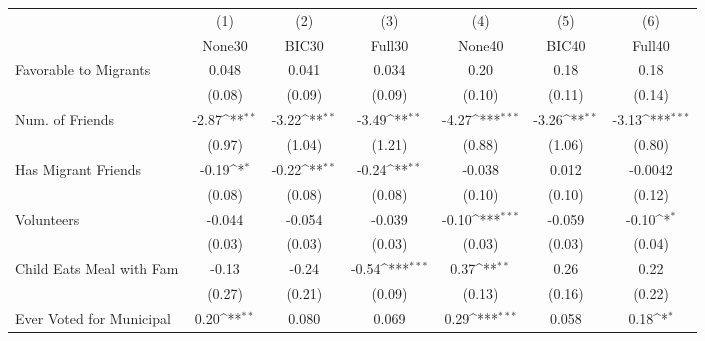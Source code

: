 {
\def\sym#1{\ifmmode^{#1}\else\(^{#1}\)\fi}
\begin{tabular}{l*{6}{c}}
\toprule
            &\multicolumn{1}{c}{(1)}&\multicolumn{1}{c}{(2)}&\multicolumn{1}{c}{(3)}&\multicolumn{1}{c}{(4)}&\multicolumn{1}{c}{(5)}&\multicolumn{1}{c}{(6)}\\
            &\multicolumn{1}{c}{None30}&\multicolumn{1}{c}{BIC30}&\multicolumn{1}{c}{Full30}&\multicolumn{1}{c}{None40}&\multicolumn{1}{c}{BIC40}&\multicolumn{1}{c}{Full40}\\
\midrule
Favorable to Migrants&       0.048         &       0.041         &       0.034         &        0.20         &        0.18         &        0.18         \\
            &      (0.08)         &      (0.09)         &      (0.09)         &      (0.10)         &      (0.11)         &      (0.14)         \\
\addlinespace
Num. of Friends&       -2.87\sym{**} &       -3.22\sym{**} &       -3.49\sym{**} &       -4.27\sym{***}&       -3.26\sym{**} &       -3.13\sym{***}\\
            &      (0.97)         &      (1.04)         &      (1.21)         &      (0.88)         &      (1.06)         &      (0.80)         \\
\addlinespace
Has Migrant Friends&       -0.19\sym{*}  &       -0.22\sym{**} &       -0.24\sym{**} &      -0.038         &       0.012         &     -0.0042         \\
            &      (0.08)         &      (0.08)         &      (0.08)         &      (0.10)         &      (0.10)         &      (0.12)         \\
\addlinespace
Volunteers  &      -0.044         &      -0.054         &      -0.039         &       -0.10\sym{***}&      -0.059         &       -0.10\sym{*}  \\
            &      (0.03)         &      (0.03)         &      (0.03)         &      (0.03)         &      (0.03)         &      (0.04)         \\
\addlinespace
Child Eats Meal with Fam&       -0.13         &       -0.24         &       -0.54\sym{***}&        0.37\sym{**} &        0.26         &        0.22         \\
            &      (0.27)         &      (0.21)         &      (0.09)         &      (0.13)         &      (0.16)         &      (0.22)         \\
\addlinespace
Ever Voted for Municipal&        0.20\sym{**} &       0.080         &       0.069         &        0.29\sym{***}&       0.058         &        0.18\sym{*}  \\

\end{tabular}}
